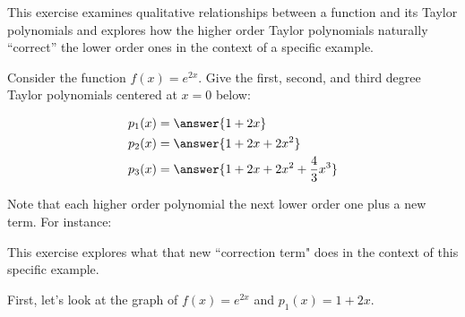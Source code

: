 \documentclass{ximera}
\author{Jim Talamo}
\begin{document}
\begin{exercise}
This exercise examines qualitative relationships between a function and its Taylor polynomials and explores how the higher order Taylor polynomials naturally ``correct'' the lower order ones in the context of a specific example.

Consider the function $f(x)=e^{2x}$.  Give the first, second, and third degree Taylor polynomials centered at $x=0$ below:

\begin{align*}
p_1(x) &= \answer{1+2x} \\
p_2(x) &= \answer{1+2x+2x^2} \\
p_3(x) &= \answer{1+2x+2x^2+\frac{4}{3}x^3}
\end{align*}

Note that each higher order polynomial the next lower order one plus a new term.  For instance:

\begin{image}
  \end{image}

This exercise explores what that new ``correction term" does in the context of this specific example.

\begin{exercise}
First, let's look at the graph of $f(x)=e^{2x}$ and $p_1(x)=1+2x$.

\begin{image}
\end{image}
\end{exercise}
\end{exercise}
\end{document}
